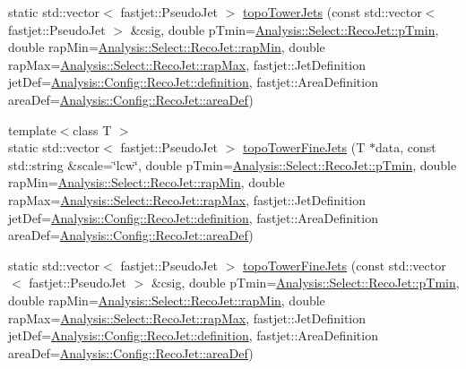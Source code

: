 \begin{DoxyCompactItemize}
\item 
static std\+::vector$<$ fastjet\+::\+Pseudo\+Jet $>$ \hyperlink{structAnalysisHelper_a995bbedf564a8eaeae68e2b2971081ae}{topo\+Tower\+Jets} (const std\+::vector$<$ fastjet\+::\+Pseudo\+Jet $>$ \&csig, double p\+Tmin=\hyperlink{namespaceAnalysis_1_1Select_1_1RecoJet_af7dbdbda43aa5be9d83a31fc3b41ac14}{Analysis\+::\+Select\+::\+Reco\+Jet\+::p\+Tmin}, double rap\+Min=\hyperlink{namespaceAnalysis_1_1Select_1_1RecoJet_a5e056f65c8f2f9b0ad358760fc0f4481}{Analysis\+::\+Select\+::\+Reco\+Jet\+::rap\+Min}, double rap\+Max=\hyperlink{namespaceAnalysis_1_1Select_1_1RecoJet_ada7395a2f03291db87208b68e4030d92}{Analysis\+::\+Select\+::\+Reco\+Jet\+::rap\+Max}, fastjet\+::\+Jet\+Definition jet\+Def=\hyperlink{namespaceAnalysis_1_1Config_1_1RecoJet_ae0c23bbd5e0420037cbbb9f7929da17f}{Analysis\+::\+Config\+::\+Reco\+Jet\+::definition}, fastjet\+::\+Area\+Definition area\+Def=\hyperlink{namespaceAnalysis_1_1Config_1_1RecoJet_a327f69062972ac03aac1dd7464fe778b}{Analysis\+::\+Config\+::\+Reco\+Jet\+::area\+Def})
\item 
{\footnotesize template$<$class T $>$ }\\static std\+::vector$<$ fastjet\+::\+Pseudo\+Jet $>$ \hyperlink{structAnalysisHelper_a2e958064b95043ba9ee041addb45e9de}{topo\+Tower\+Fine\+Jets} (T $\ast$data, const std\+::string \&scale=\char`\"{}lcw\char`\"{}, double p\+Tmin=\hyperlink{namespaceAnalysis_1_1Select_1_1RecoJet_af7dbdbda43aa5be9d83a31fc3b41ac14}{Analysis\+::\+Select\+::\+Reco\+Jet\+::p\+Tmin}, double rap\+Min=\hyperlink{namespaceAnalysis_1_1Select_1_1RecoJet_a5e056f65c8f2f9b0ad358760fc0f4481}{Analysis\+::\+Select\+::\+Reco\+Jet\+::rap\+Min}, double rap\+Max=\hyperlink{namespaceAnalysis_1_1Select_1_1RecoJet_ada7395a2f03291db87208b68e4030d92}{Analysis\+::\+Select\+::\+Reco\+Jet\+::rap\+Max}, fastjet\+::\+Jet\+Definition jet\+Def=\hyperlink{namespaceAnalysis_1_1Config_1_1RecoJet_ae0c23bbd5e0420037cbbb9f7929da17f}{Analysis\+::\+Config\+::\+Reco\+Jet\+::definition}, fastjet\+::\+Area\+Definition area\+Def=\hyperlink{namespaceAnalysis_1_1Config_1_1RecoJet_a327f69062972ac03aac1dd7464fe778b}{Analysis\+::\+Config\+::\+Reco\+Jet\+::area\+Def})
\item 
static std\+::vector$<$ fastjet\+::\+Pseudo\+Jet $>$ \hyperlink{structAnalysisHelper_a252c063dc80a8b79e6248038269bbb9d}{topo\+Tower\+Fine\+Jets} (const std\+::vector$<$ fastjet\+::\+Pseudo\+Jet $>$ \&csig, double p\+Tmin=\hyperlink{namespaceAnalysis_1_1Select_1_1RecoJet_af7dbdbda43aa5be9d83a31fc3b41ac14}{Analysis\+::\+Select\+::\+Reco\+Jet\+::p\+Tmin}, double rap\+Min=\hyperlink{namespaceAnalysis_1_1Select_1_1RecoJet_a5e056f65c8f2f9b0ad358760fc0f4481}{Analysis\+::\+Select\+::\+Reco\+Jet\+::rap\+Min}, double rap\+Max=\hyperlink{namespaceAnalysis_1_1Select_1_1RecoJet_ada7395a2f03291db87208b68e4030d92}{Analysis\+::\+Select\+::\+Reco\+Jet\+::rap\+Max}, fastjet\+::\+Jet\+Definition jet\+Def=\hyperlink{namespaceAnalysis_1_1Config_1_1RecoJet_ae0c23bbd5e0420037cbbb9f7929da17f}{Analysis\+::\+Config\+::\+Reco\+Jet\+::definition}, fastjet\+::\+Area\+Definition area\+Def=\hyperlink{namespaceAnalysis_1_1Config_1_1RecoJet_a327f69062972ac03aac1dd7464fe778b}{Analysis\+::\+Config\+::\+Reco\+Jet\+::area\+Def})

\end{DoxyCompactItemize}
